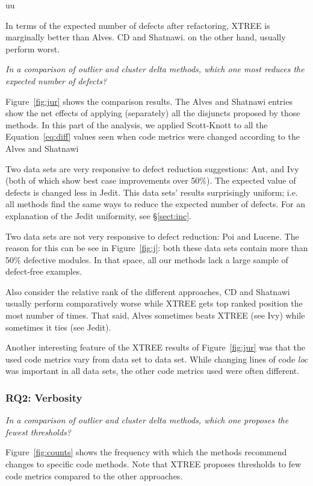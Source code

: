 uu \documentclass[final,twocolumn,5p]{elsarticle}
\newcommand{\tion}[1]{\S\ref{sect:#1}}
\newcommand{\fig}[1]{Figure~\ref{fig:#1}}
\newcommand{\eq}[1]{Equation~\ref{eq:#1}}
\theoremstyle{break}
\begin{document}
\begin{itemize}
\begin{lesson}
In terms of the expected number of defects
  after refactoring,
XTREE is marginally better than Alves. CD and Shatnawi.
on the other hand, usually perform worst.
\end{lesson}
 

{\em In a comparison of   outlier and cluster delta
methods, which one most reduces the expected number
of defects?}

\fig{jur} shows the comparison results.  The Alves and Shatnawi
entries show the net effects of applying (separately) all the disjuncts
proposed by those methods. In this part of the  analysis,
we applied Scott-Knott to all the \eq{diff} values
seen when code metrics were changed
according to the  Alves and Shatnawi


Two data sets are very responsive to defect reduction suggestions:
 Ant, and Ivy (both of which show best case improvements over 50\%).
 The  expected value of defects  
 is changed less in Jedit. This data sets' results
 surprisingly uniform; i.e.   all methods
 find the same ways to reduce the expected number of
defects.   For an explanation of the Jedit uniformity, see \tion{inc}.

Two data sets are not very responsive to defect reduction:
Poi and Lucene. The reason for this can be see in \fig{j}:
both these data sets contain more than 50\% defective modules.
In that space, all our  methods lack a large sample of
defect-free examples. 

Also consider the relative
rank of the different approaches,
 CD and Shatnawi usually  perform comparatively worse while  XTREE gets top ranked position the most
number of times. That said, Alves sometimes beats XTREE (see Ivy)
while sometimes it ties (see Jedit).


Another interesting feature of the XTREE results of
\fig{jur} was that the used code metrics vary
from data set to data set. While changing lines of
code {\em loc} was important in all data sets, 
the other code metrics used were often different.

 
 \subsubsection{RQ2: Verbosity}

{\em In a comparison of outlier and cluster delta methods, which one proposes the fewest thresholds?}

\fig{counts} shows the frequency with which the methods
recommend changes to specific code methods.
Note that XTREE proposes thresholds to
few code metrics compared to the other approaches. 


\end{itemize}
\end{document}
